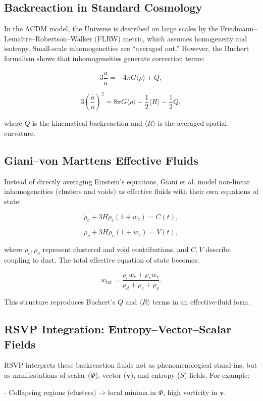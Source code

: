 \documentclass[12pt]{book}
\begin{document}
\subsection{Backreaction in Standard Cosmology}
In the ΛCDM model, the Universe is described on large scales by the Friedmann–Lemaître–Robertson–Walker (FLRW) metric, which assumes homogeneity and isotropy. Small-scale inhomogeneities are “averaged out.” However, the Buchert formalism shows that inhomogeneities generate correction terms:

\[ 3\frac{\ddot{a}}{a} = -4\pi G \langle \rho \rangle + Q, \]

\[ 3\left(\frac{\dot{a}}{a}\right)^2 = 8\pi G \langle \rho \rangle - \frac{1}{2}\langle R \rangle - \frac{1}{2} Q, \]

where \( Q \) is the kinematical backreaction and \( \langle R \rangle \) is the averaged spatial curvature.

\subsection{Giani–von Marttens Effective Fluids}
Instead of directly averaging Einstein’s equations, Giani et al. model non-linear inhomogeneities (clusters and voids) as effective fluids with their own equations of state:

\[ \dot{\rho}_c + 3H \rho_c (1 + w_c) = C(t), \]

\[ \dot{\rho}_v + 3H \rho_v (1 + w_v) = V(t), \]

where \( \rho_c, \rho_v \) represent clustered and void contributions, and \( C, V \) describe coupling to dust. The total effective equation of state becomes:

\[ w_{\text{tot}} = \frac{\rho_c w_c + \rho_v w_v}{\rho_d + \rho_c + \rho_v}. \]

This structure reproduces Buchert’s \( Q \) and \( \langle R \rangle \) terms in an effective-fluid form.

\subsection{RSVP Integration: Entropy–Vector–Scalar Fields}
RSVP interprets these backreaction fluids not as phenomenological stand-ins, but as manifestations of scalar (\( \Phi \)), vector (\( \mathbf{v} \)), and entropy (\( S \)) fields. For example:

- Collapsing regions (clusters) → local minima in \( \Phi \), high vorticity in \( \mathbf{v} \).
\end{document}
